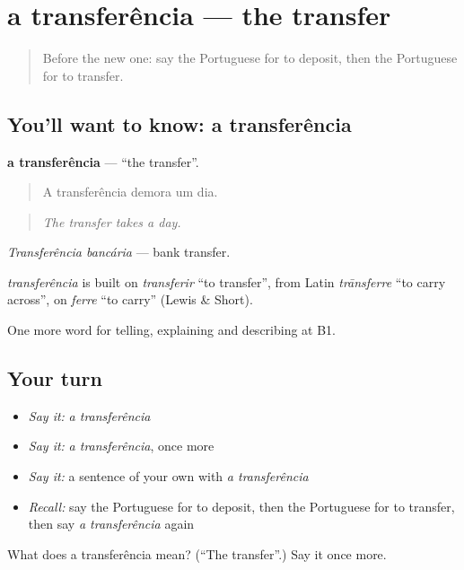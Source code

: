 \section[a transferência]{a transferência — the transfer}

\label{lesson:PT-C393-transferencia}



\begin{quote}
Before the new one: say the Portuguese for to deposit, then the Portuguese for to transfer.
\end{quote}

\subsection*{You'll want to know: a transferência}
\textbf{a transferência} — \textquotedblleft{}the transfer\textquotedblright{}.

\begin{quote}
A transferência demora um dia.
\end{quote}

\begin{quote}
\emph{The transfer takes a day.}
\end{quote}

\emph{Transferência bancária} — bank transfer.

\begin{cousinweb}
\emph{transferência} is built on \emph{transferir} \textquotedblleft{}to transfer\textquotedblright{}, from Latin \emph{trānsferre} \textquotedblleft{}to carry across\textquotedblright{}, on \emph{ferre} \textquotedblleft{}to carry\textquotedblright{} (Lewis \& Short).
\end{cousinweb}

\begin{grammarlens}[title={What you've built}]
One more word for telling, explaining and describing at B1.
\end{grammarlens}

\subsection*{Your turn}
\begin{itemize}
\raggedright
  \item \emph{Say it:} \emph{a transferência}
  \item \emph{Say it:} \emph{a transferência}, once more
  \item \emph{Say it:} a sentence of your own with \emph{a transferência}
  \item \emph{Recall:} say the Portuguese for to deposit, then the Portuguese for to transfer, then say \emph{a transferência} again
\end{itemize}

\begin{tcolorbox}[breakable,colback=teal!4,colframe=teal!35!black,title={Before you move on}]
What does a transferência mean? (\textquotedblleft{}The transfer\textquotedblright{}.) Say it once more.
\end{tcolorbox}
